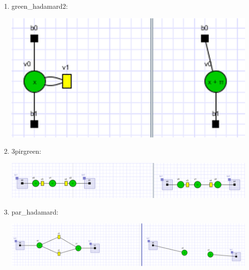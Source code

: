 \documentclass[a4paper,oneside]{book}
\begin{document}
\begin{enumerate}
\item green\_hadamard2:
\begin{center}
\includegraphics[scale=0.5]{IMG/greenH2.eps}
\end{center}

\item 3pirgreen:
\begin{center}
\includegraphics[scale=0.45]{IMG/3pirgreen.eps}
\end{center}

\item par\_hadamard:
\begin{center}
\includegraphics[scale=0.45]{IMG/parH.eps}
\end{center}


\end{enumerate}
\end{document}
